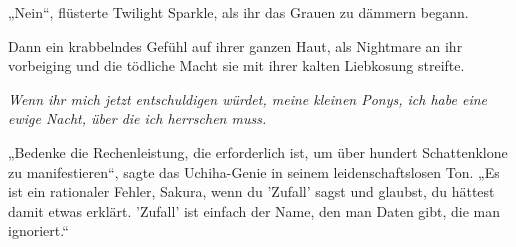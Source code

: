 „Nein“, flüsterte Twilight Sparkle, als ihr das Grauen zu dämmern begann.

Dann ein krabbelndes Gefühl auf ihrer ganzen Haut, als Nightmare an ihr vorbeiging und die tödliche Macht sie mit ihrer kalten Liebkosung streifte.

\emph{Wenn ihr mich jetzt entschuldigen würdet, meine kleinen Ponys, ich habe eine ewige Nacht, über die ich herrschen muss.}

\clearpage
{}


„Bedenke die Rechenleistung, die erforderlich ist, um über hundert Schattenklone zu manifestieren“, sagte das Uchiha-Genie in seinem leidenschaftslosen Ton. „Es ist ein rationaler Fehler, Sakura, wenn du 'Zufall' sagst und glaubst, du hättest damit etwas erklärt. 'Zufall' ist einfach der Name, den man Daten gibt, die man ignoriert.“

